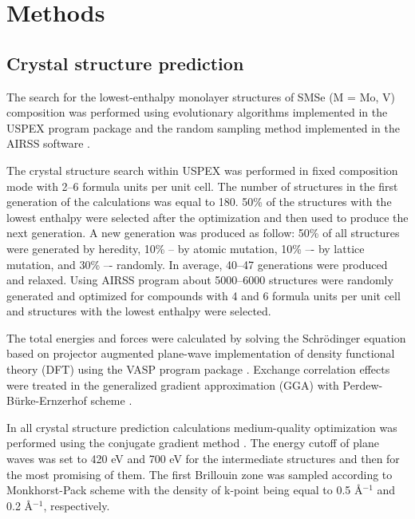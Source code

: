 \documentclass[a4paperm]{article}
\begin{document}
		\section{Methods}

\subsection*{Crystal structure prediction}


The search for the lowest-enthalpy monolayer structures of SMSe (M = Mo, V) composition was performed using evolutionary algorithms implemented in the USPEX program package \cite{uspex1,uspex2,uspex3} and the random sampling method implemented in the AIRSS software \cite{airss1,airss2}.

The crystal structure search within USPEX was performed in fixed composition mode with 2--6 formula units per unit cell.
The number of structures in the first generation of the calculations was equal to 180.
50\% of the structures with the lowest enthalpy were selected after the optimization and then used to produce the next generation.
A new generation was produced as follow: 50\% of all structures were generated by heredity, 10\% -- by atomic mutation, 10\% –- by lattice mutation, and 30\% –- randomly.
In average, 40--47 generations were produced and relaxed.
Using AIRSS program about 5000--6000 structures were randomly generated and optimized for compounds with 4 and 6 formula units per unit cell and structures with the lowest enthalpy were selected.

The total energies and forces were calculated by solving the Schr\"{o}dinger equation based on projector augmented plane-wave implementation \cite{blochl1994projector} of density functional theory (DFT) using the VASP program package \cite{vasp1,vasp2}.
Exchange correlation effects were treated in the generalized gradient approximation (GGA) with Perdew-B\"{u}rke-Ernzerhof scheme \cite{pbe}.

In all crystal structure prediction calculations medium-quality optimization was performed using the conjugate gradient method \cite{conjugate_gradient}. 
The energy cutoff of plane waves was set to 420 eV and 700 eV for the intermediate structures and then for the most promising of them. 
The first Brillouin zone was sampled according to Monkhorst-Pack scheme \cite{monkhorst1976special} with the density of k-point being equal to 0.5 \AA$^{-1}$ and 0.2 \AA$^{-1}$, respectively. 
\end{document}
